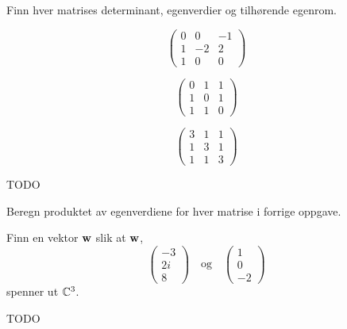 \begin{oppgave}
Finn hver matrises determinant, egenverdier og tilhørende egenrom. 
\begin{punkt}
\[
\begin{pmatrix}
0 & 0 & -1 \\ 1 & -2 & 2 \\ 1 & 0 & 0 
\end{pmatrix}
\]
\end{punkt}

\begin{punkt}
\[
\begin{pmatrix}
0 & 1 & 1 \\ 1 & 0 & 1 \\ 1 & 1 & 0 
\end{pmatrix}
\]
\end{punkt}


\begin{punkt}
\[
\begin{pmatrix}
3 & 1 & 1 \\ 1 & 3 & 1 \\ 1 & 1 & 3 
\end{pmatrix}
\]
\end{punkt}

\end{oppgave}


\begin{losning}
TODO
\end{losning}

\begin{oppgave}
Beregn produktet av egenverdiene for hver matrise i forrige oppgave.
\end{oppgave}

\begin{oppgave}
Finn en vektor $\mathbf{w}$ slik at $\mathbf{w}$, 
\[
\begin{pmatrix}
-3 \\ 2i \\ 8 
\end{pmatrix}
\quad 
\text{og}
\quad 
\begin{pmatrix}
1 \\ 0 \\ -2 
\end{pmatrix}
\]
spenner ut $\mathbb{C}^3$.
\end{oppgave}

\begin{losning}
TODO
\end{losning}


